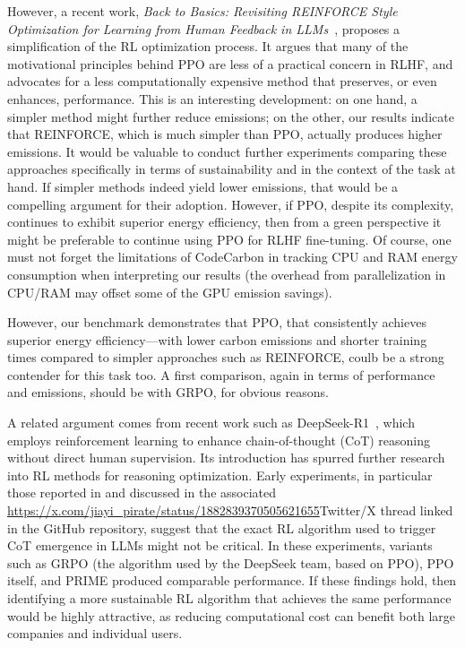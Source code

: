 However, a recent work, \emph{Back to Basics: Revisiting REINFORCE Style Optimization for Learning from Human Feedback in LLMs}~\cite{ahmadian:back_to_basics}, proposes a simplification of the RL optimization process. 
It argues that many of the motivational principles behind PPO are less of a practical concern in RLHF, and 
advocates for a less computationally expensive method that preserves, or even enhances, performance. 
This is an interesting development: on one hand, a simpler method might further reduce emissions; on the other, 
our results indicate that REINFORCE, which is much simpler than PPO, actually produces higher emissions. 
It would be valuable to conduct further experiments comparing these approaches specifically in terms of sustainability and in the context of the task at hand.
If simpler methods indeed yield lower emissions, that would be a compelling argument for their adoption. 
However, if PPO, despite its complexity, continues to exhibit superior energy efficiency, then from a green perspective 
it might be preferable to continue using PPO for RLHF fine-tuning. Of course, one must not forget the limitations of CodeCarbon
in tracking CPU and RAM energy consumption when interpreting our results (the overhead from parallelization in CPU/RAM may offset some of the GPU emission savings).

However, our benchmark demonstrates that PPO, that consistently achieves superior energy efficiency—with lower 
carbon emissions and shorter training times compared to simpler approaches such as REINFORCE, coulb be a strong contender for this task too. A first comparison, again in terms of performance and emissions, should be with GRPO, for obvious reasons.

A related argument comes from recent work such as DeepSeek-R1~\cite{deepseekai:r1}, which employs reinforcement learning to enhance chain-of-thought (CoT) reasoning without direct human supervision. Its introduction has spurred further research into RL methods for reasoning optimization. Early experiments, in particular those reported in \cite{pan:tinyzero} and discussed in the associated \url{https://x.com/jiayi_pirate/status/1882839370505621655}{Twitter/X thread} linked in the GitHub repository, suggest that the exact RL algorithm used to trigger CoT emergence in LLMs might not be critical. In these experiments, variants such as GRPO (the algorithm used by the DeepSeek team, based on PPO), PPO itself, and PRIME produced comparable performance. If these findings hold, then identifying a more sustainable RL algorithm that achieves the same performance would be highly attractive, as reducing computational cost can benefit both large companies and individual users.

